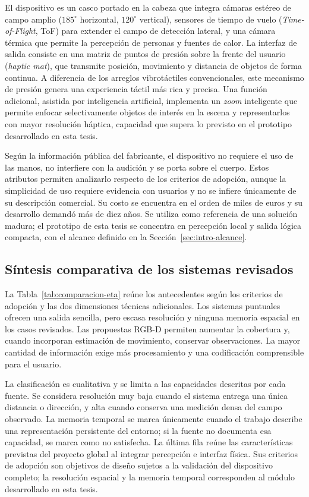 El dispositivo es un casco portado en la cabeza que integra cámaras estéreo de campo amplio
($185^\circ$ horizontal, $120^\circ$ vertical), sensores de tiempo de vuelo (\emph{Time-of-Flight}, ToF)
para extender el campo de detección lateral, y una cámara térmica que permite la percepción de
personas y fuentes de calor. La interfaz de salida consiste en una matriz de puntos de presión
sobre la frente del usuario (\emph{haptic mat}), que transmite posición, movimiento y distancia
de objetos de forma continua. A diferencia de los arreglos vibrotáctiles convencionales, este
mecanismo de presión genera una experiencia táctil más
rica y precisa. Una función adicional, asistida por inteligencia artificial, implementa un
\emph{zoom} inteligente que permite enfocar selectivamente objetos de interés en la escena y
representarlos con mayor resolución háptica, capacidad que supera lo previsto en el prototipo
desarrollado en esta tesis.

Según la información pública del fabricante, el dispositivo no requiere el uso de las manos, no
interfiere con la audición y se porta sobre el cuerpo. Estos atributos permiten analizarlo respecto
de los criterios de adopción, aunque la simplicidad de uso requiere evidencia con usuarios y no se
infiere únicamente de su descripción comercial. Su costo se encuentra en el orden de miles de
euros y su desarrollo demandó más de diez años. Se utiliza como referencia de una solución madura;
el prototipo de esta tesis se concentra en percepción local y salida lógica compacta, con el
alcance definido en la Sección~\ref{sec:intro-alcance}.

\subsection{Síntesis comparativa de los sistemas revisados}
\label{subsec:ea-sintesis-comparativa}

La Tabla~\ref{tab:comparacion-eta} reúne los antecedentes según los criterios de adopción y las
dos dimensiones técnicas adicionales. Los sistemas puntuales ofrecen una salida sencilla, pero
escasa resolución y ninguna memoria espacial en los casos revisados. Las propuestas RGB-D
permiten aumentar la cobertura y, cuando incorporan estimación de movimiento, conservar
observaciones. La mayor cantidad de información exige más procesamiento y una codificación
comprensible para el usuario.

La clasificación es cualitativa y se limita a las capacidades descritas por cada fuente. Se
considera resolución muy baja cuando el sistema entrega una única distancia o dirección, y alta
cuando conserva una medición densa del campo observado. La memoria temporal se marca únicamente
cuando el trabajo describe una representación persistente del entorno; si la fuente no documenta
esa capacidad, se marca como no satisfecha. La última fila reúne las características previstas
del proyecto global al integrar percepción e interfaz física. Sus criterios de adopción son
objetivos de diseño sujetos a la validación del dispositivo completo; la resolución espacial y
la memoria temporal corresponden al módulo desarrollado en esta tesis.

